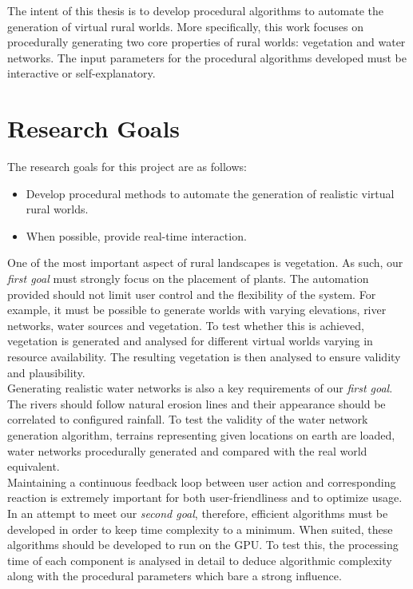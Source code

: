 The intent of this thesis is to develop procedural algorithms to automate the generation of virtual rural worlds. More specifically, this work focuses on procedurally generating two core properties of rural worlds: vegetation and water networks. The input parameters for the procedural algorithms developed must be interactive or self-explanatory. 

\newpage
\section{Research Goals}

The research goals for this project are as follows:
\begin{itemize}
\item Develop procedural methods to automate the generation of realistic virtual rural worlds.
\item When possible, provide real-time interaction.
\end{itemize}

One of the most important aspect of rural landscapes is vegetation. As such, our \textit{first goal} must strongly focus on the placement of plants. The automation provided should not limit user control and the flexibility of the system. For example, it must be possible to generate worlds with varying elevations, river networks, water sources and vegetation. To test whether this is achieved, vegetation is generated and analysed for different virtual worlds varying in resource availability. The resulting vegetation is then analysed to ensure validity and plausibility. \\

Generating realistic water networks is also a key requirements of our \textit{first goal}. The rivers should follow natural erosion lines and their appearance should be correlated to configured rainfall. To test the validity of the water network generation algorithm, terrains representing given locations on earth are loaded, water networks procedurally generated and compared with the real world equivalent. \\

Maintaining a continuous feedback loop between user action and corresponding reaction is extremely important for both user-friendliness and to optimize usage. In an attempt to meet our \textit{second goal}, therefore, efficient algorithms must be developed in order to keep time complexity to a minimum. When suited, these algorithms should be developed to run on the GPU. To test this, the processing time of each component is analysed in detail to deduce algorithmic complexity along with the procedural parameters which bare a strong influence. \\

